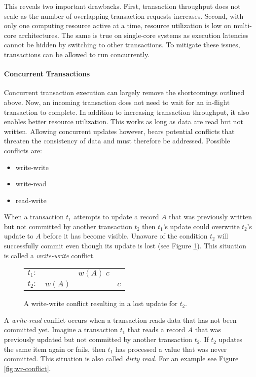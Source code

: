 This reveals two important drawbacks. First, transaction throughput does not
scale as the number of overlapping transaction requests increases. Second, with
only one computing resource active at a time, resource utilization is low on
multi-core architectures. The same is true on single-core systems as execution
latencies cannot be hidden by switching to other transactions. To mitigate these
issues, transactions can be allowed to run concurrently.

\paragraph{Concurrent Transactions}

Concurrent transaction execution can largely remove the shortcomings outlined above. Now, an incoming transaction does not need to wait for an in-flight transaction to complete. In addition to increasing transaction throughput, it also enables better resource utilization. This works as long as data are read but not written. Allowing concurrent updates however, bears potential conflicts that threaten the consistency of data and must therefore be addressed. Possible conflicts are:

\begin{itemize}
    \item write-write
    \item write-read
    \item read-write
\end{itemize}

When a transaction $t_1$ attempts to update a record $A$ that was previously
written but not committed by another transaction $t_2$ then $t_1$'s update could
overwrite $t_2$'s update to $A$ before it has become visible. Unaware of the
condition $t_2$ will successfully commit even though its update is lost (see
Figure \ref{fig:ww-conflict}). This situation is called a \emph{write-write}
conflict.

\begin{figure}[h!]
    \centering
    \begin{tabular}{r c c c}
        $t_1:$ &        & $w(A)\; c$ &     \\
        $t_2:$ & $w(A)$ &            & $c$ \\
    \end{tabular}
    \caption{A write-write conflict resulting in a lost update for $t_2$.}
    \label{fig:ww-conflict}
\end{figure}

A \emph{write-read} conflict occurs when a transaction reads data that has not
been committed yet. Imagine a transaction $t_1$ that reads a record $A$ that was
previously updated but not committed by another transaction $t_2$. If $t_2$
updates the same item again or fails, then $t_1$ has processed a value that was
never committed. This situation is also called \emph{dirty read}. For an example see Figure \ref{fig:wr-conflict}.

